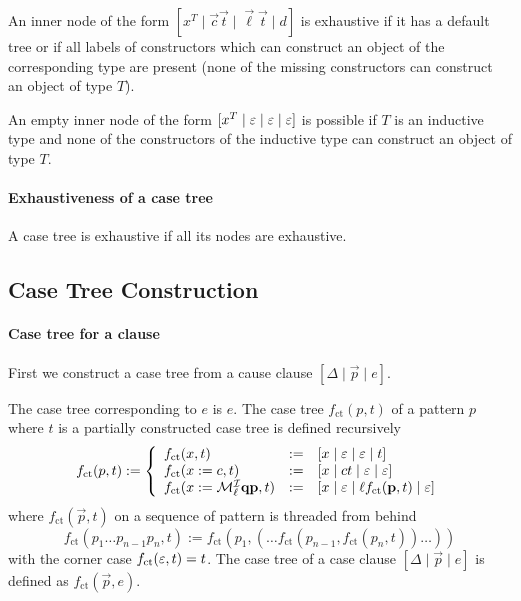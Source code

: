 An inner node of the form $[x^T \mid \vec c \vec t \mid \vec\ell \vec t \mid d]$ is
exhaustive if it has a default tree or if all labels of constructors which can
construct an object of the corresponding type are present (none of the missing
constructors can construct an object of type $T$).

An empty inner node of the form $[x^T \mid \varepsilon \mid \varepsilon \mid \varepsilon]$ is
possible if $T$ is an inductive type and none of the constructors of the
inductive type can construct an object of type $T$.

\paragraph{Exhaustiveness of a case tree}
%
A case tree is exhaustive if all its nodes are exhaustive.




\subsection{Case Tree Construction}

\paragraph{Case tree for a clause}
First we construct a case tree from a cause clause
$[\Delta \mid \vec p \mid e]$.

{
    \def\ct{f_\text{ct}}
    The case tree corresponding to $e$ is $e$. The case tree $\ct(p, t)$ of a
    pattern $p$ where $t$ is a partially constructed case tree is defined
    recursively
    $$
    \ct(p, t) := \left\{
        \begin{array}{lll}
            \ct(x,t)
            &:=&
            [x \mid \empty \mid \empty \mid t]
            \\
            \ct(x := c, t)
            &:=&
            [x \mid c t \mid \empty \mid \empty]
            \\
            \ct(x := \Make^\Ind_\ell \vec q \vec p, t)
            &:=&
            [x \mid \empty \mid \ell \ct(\vec p, t) \mid \empty]
        \end{array}
    \right.
    $$
    where $\ct(\vec p, t)$ on a sequence of pattern is threaded from behind
    $$
    \ct(p_1 \ldots p_{n-1} p_n, t)
    :=
    \ct(p_1, (\ldots \ct(p_{n-1}, \ct(p_n, t))\ldots))
    $$
    with the corner case $\ct(\empty, t) = t$.
    The case tree of a case clause $[\Delta \mid \vec p \mid e]$ is defined as
    $\ct(\vec p, e)$.
}


